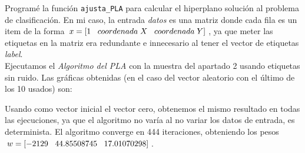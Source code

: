\documentclass{article}
\begin{document}
Programé la función \texttt{ajusta\_PLA} para calcular el hiperplano solución al problema de clasificación. En mi caso, la entrada \textit{datos} es una matriz donde cada fila es un item de la forma $x = [1 \hspace{3mm} coordenada\hspace{1mm}X \hspace{3mm} coordenada\hspace{1mm}Y]$, ya que meter las etiquetas en la matriz era redundante e innecesario al tener el vector de etiquetas \textit{label}.\\

Ejecutamos el \textit{Algoritmo del PLA} con la muestra del apartado  2 usando etiquetas sin ruido. Las gráficas obtenidas (en el caso del vector aleatorio con el último de los 10 usados) son:

\begin{figure}[H]
  \centering
\end{figure}

Usando como vector inicial el vector cero, obtenemos el mismo resultado en todas las ejecuciones, ya que el algoritmo no varía al no variar los datos de entrada, es determinista. El algoritmo converge en 444 iteraciones, obteniendo los pesos $w = [ -2129 \hspace{3mm} 44.85508745 \hspace{3mm} 17.01070298 ]$.
\end{document}
